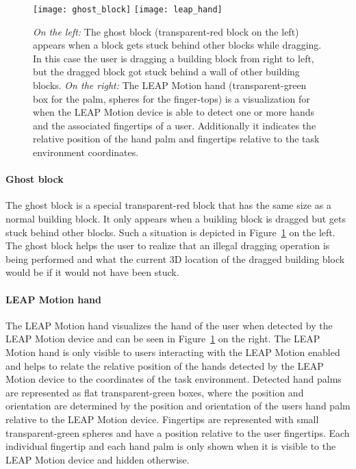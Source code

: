 \begin{figure}[H]
\centering
\texttt{[image: ghost\_block]}
\texttt{[image: leap\_hand]}
\caption{\label{fig:ghostblock} \textit{On the left:} The ghost block (transparent-red block on the left) appears when a block gets stuck behind other blocks while dragging. In this case the user is dragging a building block from right to left, but the dragged block got stuck behind a wall of other building blocks. \textit{On the right:} The LEAP Motion hand (transparent-green box for the palm, spheres for the finger-tops) is a visualization for when the LEAP Motion device is able to detect one or more hands and the associated fingertips of a user. Additionally it indicates the relative position of the hand palm and fingertips relative to the task environment coordinates. 
}
\end{figure}

\paragraph{Ghost block}
The ghost block is a special transparent-red block that has the same size as a normal building block. It only appears when a building block is dragged but gets stuck behind other blocks. Such a situation is depicted in Figure~\ref{fig:ghostblock} on the left. The ghost block helps the user to realize that an illegal dragging operation is being performed and what the current 3D location of the dragged building block would be if it would not have been stuck.


\paragraph{LEAP Motion hand}
The LEAP Motion hand visualizes the hand of the user when detected by the LEAP Motion device and can be seen in Figure~\ref{fig:ghostblock} on the right. The LEAP Motion hand is only visible to users interacting with the LEAP Motion enabled and helps to relate the relative position of the hands detected by the LEAP Motion device to the coordinates of the task environment. Detected hand palms are represented as flat transparent-green boxes, where the position and orientation are determined by the position and orientation of the users hand palm relative to the LEAP Motion device. Fingertips are represented with small transparent-green spheres and have a position relative to the user fingertips. Each individual fingertip and each hand palm is only shown when it is visible to the LEAP Motion device and hidden otherwise.

